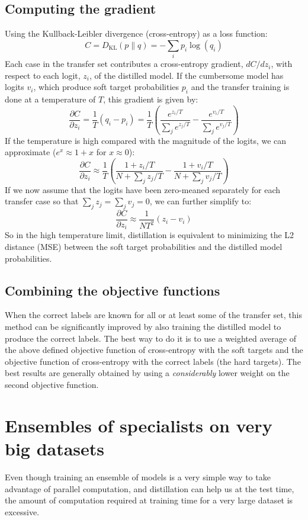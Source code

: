 \documentclass[a4paper,twocolumn]{article}
\begin{document}
\subsection{Computing the gradient}
Using the Kullback-Leibler divergence (cross-entropy) as a loss function:
\[
    C = D_{\mathrm{KL}}(p\|q) = - \sum_i p_i \log(q_i)
\]
Each case in the transfer set contributes a cross-entropy gradient, $dC/dz_i$, with respect to each logit, $z_i$, of the distilled model. If the cumbersome model has logits $v_i$, which produce soft target probabilities $p_i$ and the transfer training is done at a temperature of $T$, this gradient is given by:
\[
    \frac{\partial C}{\partial z_i} = \frac{1}{T}(q_i - p_i) = \frac{1}{T}\left( \frac{e^{z_i/T}}{\sum_j e^{z_j/T}} - \frac{e^{v_i/T}}{\sum_j e^{v_j/T}} \right)
\]
If the temperature is high compared with the magnitude of the logits, we can approximate ($e^x \approx 1+x$ for $x \approx 0$):
\[
    \frac{\partial C}{\partial z_i} \approx \frac{1}{T}\left( \frac{1 + z_i/T}{N + \sum_j z_j/T} - \frac{1 + v_i/T}{N + \sum_j v_j/T} \right)
\]
If we now assume that the logits have been zero-meaned separately for each transfer case so that $\sum_j z_j = \sum_j v_j = 0$, we can further simplify to:
\[
    \frac{\partial C}{\partial z_i} \approx \frac{1}{NT^2} (z_i - v_i)
\]
So in the high temperature limit, distillation is equivalent to minimizing the L2 distance (MSE) between the soft target probabilities and the distilled model probabilities.

\subsection{Combining the objective functions}
When the correct labels are known for all or at least some of the transfer set, this method can be significantly improved by also training the distilled model to produce the correct labels. The best way to do it is to use a weighted average of the above defined objective function of cross-entropy with the soft targets and the objective function of cross-entropy with the correct labels (the hard targets). The best results are generally obtained by using a \textit{considerably} lower weight on the second objective function.

\section{Ensembles of specialists on very big datasets}
Even though training an ensemble of models is a very simple way to take advantage of parallel computation, and distillation can help us at the test time, the amount of computation required at training time for a very large dataset is excessive.
\end{document}
